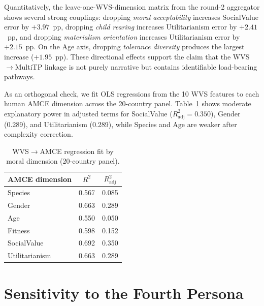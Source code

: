 \documentclass{article}
\begin{document}
Quantitatively, the leave-one-WVS-dimension matrix from the round-2
aggregator shows several strong couplings: dropping \emph{moral
acceptability} increases SocialValue error by $+3.97$~pp, dropping
\emph{child rearing} increases Utilitarianism error by $+2.41$~pp, and
dropping \emph{materialism orientation} increases Utilitarianism error by
$+2.15$~pp. On the Age axis, dropping \emph{tolerance diversity} produces
the largest increase ($+1.95$~pp). These directional effects support the
claim that the WVS$\rightarrow$MultiTP linkage is not purely narrative but
contains identifiable load-bearing pathways.

As an orthogonal check, we fit OLS regressions from the 10 WVS features to each
human AMCE dimension across the 20-country panel. Table~\ref{tab:r2_wvs_regression}
shows moderate explanatory power in adjusted terms for SocialValue
($R^2_{\mathrm{adj}}=0.350$), Gender (0.289), and Utilitarianism (0.289), while
Species and Age are weaker after complexity correction.
\begin{table}[h]\centering\scriptsize
\caption{WVS$\rightarrow$AMCE regression fit by moral dimension (20-country panel).}
\label{tab:r2_wvs_regression}
\begin{tabular}{lcc}\toprule
AMCE dimension & $R^2$ & $R^2_{\text{adj}}$ \\\midrule
Species & 0.567 & 0.085 \\
Gender & 0.663 & 0.289 \\
Age & 0.550 & 0.050 \\
Fitness & 0.598 & 0.152 \\
SocialValue & 0.692 & 0.350 \\
Utilitarianism & 0.663 & 0.289 \\
\bottomrule
\end{tabular}
\end{table}

\section{Sensitivity to the Fourth Persona}
\label{app:r2_persona_variant}
\end{document}
